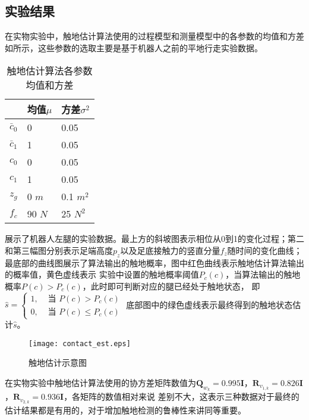 \subsection{实验结果}
在实物实验中，触地估计算法使用的过程模型和测量模型中的各参数的均值和方差如所示，这些参数的选取主要是基于机器人之前的平地行走实验数据。
\begin{table}[htbp]
	\centering
	\caption{触地估计算法各参数均值和方差}
	\label{tab:contact_para}
	\begin{tabular}{m{2cm}<{\centering}m{3cm}<{\centering}m{3cm}<{\centering}}
		\toprule  %
		\fangsong{参数名称}   & 均值$\mu$ & 方差$\sigma^2$  \\
		\midrule  %
		$\bar{c}_0$    & 0 & 0.05\\
		$\bar{c}_1$ & 1 & 0.05 \\
		${c}_0$ & 0 & 0.05 \\
        ${c}_1$ & 1 & 0.05 \\
        ${z}_g$ & 0 $m$ & 0.1 $m^2$ \\
        ${f}_c$ & 90 $N$ & 25 $N^2$ \\
		\bottomrule %
	\end{tabular}
\end{table}
展示了机器人左腿的实验数据。最上方的斜坡图表示相位从0到1的变化过程；第二和第三幅图分别表示足端高度$p_z$以及足底接触力的竖直分量$f_z$随时间的变化曲线；
最底部的曲线图展示了算法输出的触地概率，图中红色曲线表示触地估计算法输出的概率值，黄色虚线表示
实验中设置的触地概率阈值$P_{c}(c)$，当算法输出的触地概率$P(c)>P_{c}(c)$，此时即可判断对应的腿已经处于触地状态，
即$\hat{s}= \begin{cases}1, & \text { 当 } P(c)>P_c(c) \\ 0, & \text { 当 } P(c) \leq P_c(c)\end{cases}$
底部图中的绿色虚线表示最终得到的触地状态估计$\hat{s}$。
\begin{figure}[h]
    \centering
    \texttt{[image: contact\_est.eps]}
    \caption{\label{fig:contact_est}触地估计示意图}
\end{figure}

在实物实验中触地估计算法使用的协方差矩阵数值为$\boldsymbol{Q}_{w_k}=0.995\mathbf{I}$，$\boldsymbol{R}_{v_{1,k}}=0.826 \mathbf{I}$，$\boldsymbol{R}_{v_{2,k}}=0.936 \mathbf{I}$，各矩阵的数值相对来说
差别不大，这表示三种数据对于最终的估计结果都是有用的，对于增加触地检测的鲁棒性来讲同等重要。

